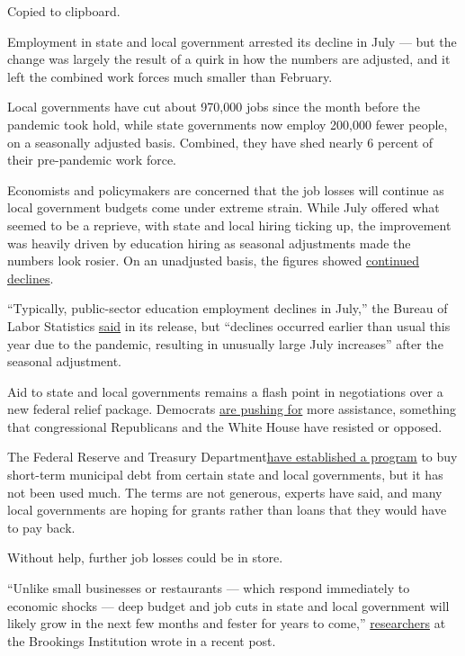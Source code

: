 Copied to clipboard.

Employment in state and local government arrested its decline in July
--- but the change was largely the result of a quirk in how the numbers
are adjusted, and it left the combined work forces much smaller than
February.

Local governments have cut about 970,000 jobs since the month before the
pandemic took hold, while state governments now employ 200,000 fewer
people, on a seasonally adjusted basis. Combined, they have shed nearly
6 percent of their pre-pandemic work force.

Economists and policymakers are concerned that the job losses will
continue as local government budgets come under extreme strain. While
July offered what seemed to be a reprieve, with state and local hiring
ticking up, the improvement was heavily driven by education hiring as
seasonal adjustments made the numbers look rosier. On an unadjusted
basis, the figures showed
\href{https://fred.stlouisfed.org/series/CEU9093000001}{continued
declines}.

``Typically, public-sector education employment declines in July,'' the
Bureau of Labor Statistics
\href{https://www.bls.gov/news.release/empsit.nr0.htm}{said} in its
release, but ``declines occurred earlier than usual this year due to the
pandemic, resulting in unusually large July increases'' after the
seasonal adjustment.

Aid to state and local governments remains a flash point in negotiations
over a new federal relief package. Democrats
\href{https://www.nytimes3xbfgragh.onion/2020/08/05/us/politics/congress-coronavirus-stimulus.html}{are
pushing for} more assistance, something that congressional Republicans
and the White House have resisted or opposed.

The Federal Reserve and Treasury
Department\href{https://www.nytimes3xbfgragh.onion/2020/08/06/business/house-democrats-want-fed-to-give-cities-and-states-more-help-by-improving-program-terms.html}{have
established a program} to buy short-term municipal debt from certain
state and local governments, but it has not been used much. The terms
are not generous, experts have said, and many local governments are
hoping for grants rather than loans that they would have to pay back.

Without help, further job losses could be in store.

``Unlike small businesses or restaurants --- which respond immediately
to economic shocks --- deep budget and job cuts in state and local
government will likely grow in the next few months and fester for years
to come,''
\href{https://www.brookings.edu/blog/the-avenue/2020/08/03/state-and-local-governments-employ-the-highest-share-of-essential-workers-congress-is-failing-to-protect-them/}{researchers}
at the Brookings Institution wrote in a recent post.


